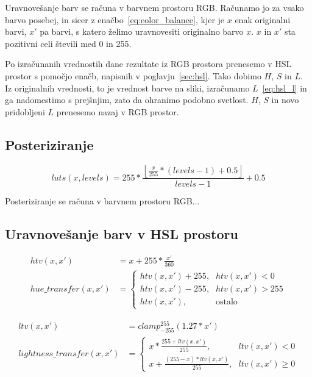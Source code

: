 Uravnovešanje barv se računa v barvnem prostoru RGB. Računamo jo za vsako
barvo posebej, in sicer z enačbo~\eqref{eq:color_balance}, kjer je $x$ enak
originalni barvi, $x'$ pa barvi, s katero želimo uravnovesiti originalno barvo
$x$. $x$ in $x'$ sta pozitivni celi števili med 0 in 255.

Po izračunanih vrednostih dane rezultate iz RGB prostora prenesemo v HSL
prostor s pomočjo enačb, napisnih v poglavju~\ref{sec:hsl}. Tako dobimo $H$,
$S$ in $L$. Iz originalnih vrednosti, to je vrednost barve na sliki,
izračunamo $L$~\ref{eq:hsl_l} in ga nadomestimo s prejšnjim, zato da ohranimo
podobno svetlost. $H$, $S$ in novo pridobljeni $L$ prenesemo nazaj v RGB
prostor.


\subsection{Posteriziranje}
\label{sec:obdelavaSlikPosteriziranje}

\begin{equation}
luts(x, levels) = 255 * \frac{\left \lfloor{\frac{x}{255} * (levels - 1) + 0.5}\right \rfloor}{levels - 1} + 0.5
\end{equation}

Posteriziranje se računa v barvnem prostoru RGB...


\subsection{Uravnovešanje barv v HSL prostoru}
\label{sec:obdelavaSlikUravnovesanjeBarvHSL}

\begin{align}
htv(x, x') &= x + 255 * \frac{x'}{360} \nonumber \\
hue\_transfer(x, x') &=
\begin{cases}
    htv(x, x') + 255 \text{,}& htv(x, x') < 0 \\
    htv(x, x') - 255 \text{,}& htv(x, x') > 255 \\
    htv(x, x') \text{,}& \text{ostalo}
\end{cases}
\end{align}

\begin{align}
ltv(x, x') &= clamp_{-255}^{255}(1.27 * x') \nonumber \\
lightness\_transfer(x, x') &=
\begin{cases}
    x * \frac{255 + ltv(x, x')}{255} \text{,}& ltv(x, x') < 0 \\
    x + \frac{(255 - x) * ltv(x, x')}{255} \text{,}& ltv(x, x') \geq 0
\end{cases}
\end{align}

